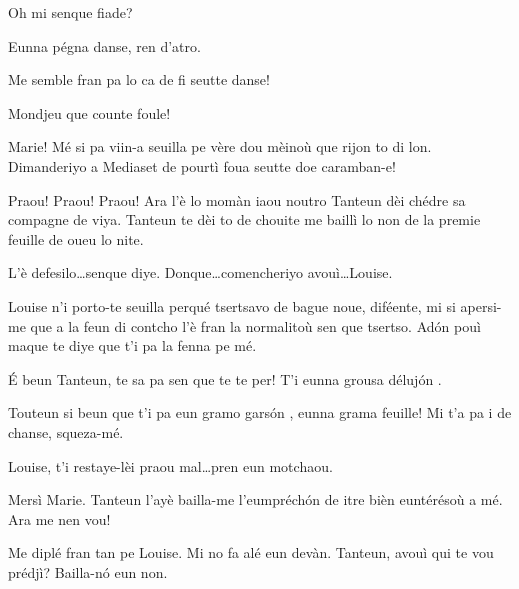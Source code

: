 \begin{drama}


\Alicespeaks{} Oh mi senque fiade?

\Tanteunspeaks Eunna pégna danse, ren d'atro.

\Sperancespeaks Me semble fran pa lo ca de fi seutte danse!

\Tanteunspeaks Mondjeu que counte foule!


\Alicespeaks Marie! Mé si pa viin-a seuilla pe vère dou mèinoù que rijon to di lon. Dimanderiyo a Mediaset de pourtì foua seutte doe caramban-e!

\Mariespeaks Praou! Praou! Praou! Ara l'è lo momàn iaou noutro Tanteun dèi chédre sa compagne de viya. Tanteun te dèi to de chouite me baillì lo non de la premie feuille de oueu lo nite.

\Tanteunspeaks{} L'è defesilo\ldots senque diye. Donque\ldots comencheriyo avouì\ldots Louise.


\Tanteunspeaks Louise n'i porto-te seuilla perqué tsertsavo de bague noue, diféente, mi si apersi-me que a la feun di contcho l'è fran la normalitoù sen que tsertso. Ad\'on pouì maque te diye que t'i pa la fenna pe mé.

\Louisespeaks {} \'E beun Tanteun, te sa pa sen que te te per! T'i eunna grousa déluj\'on .

\Tanteunspeaks Touteun si beun que t'i pa eun gramo gars\'on , eunna grama feuille! Mi t'a pa i de chanse, squeza-mé.

\Mariespeaks Louise, t’i restaye-lèi praou mal\ldots pren eun motchaou.


\Louisespeaks Mersì Marie. Tanteun l’ayè bailla-me l’eumpréch\'on de itre bièn euntérésoù a mé. Ara me nen vou!


\Mariespeaks Me diplé fran tan pe Louise. Mi no fa alé eun devàn. Tanteun, avouì qui te vou prédjì? Bailla-n\'o eun non.


\end{drama}
